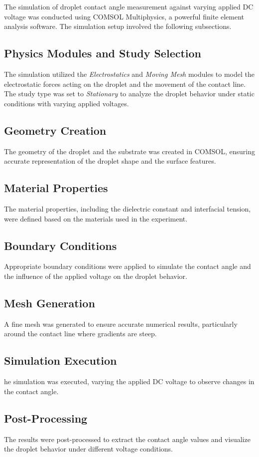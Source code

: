 \documentclass[9pt,a4paper,twocolumn,twoside]{tau-class/tau}
\begin{document}
The simulation of droplet contact angle measurement against varying applied DC voltage was conducted using COMSOL Multiphysics, a powerful finite element analysis software. The simulation setup involved the following subsections.

\subsection{Physics Modules and Study Selection}
The simulation utilized the \textit{Electrostatics} and \textit{Moving Mesh} modules to model the electrostatic forces acting on the droplet and the movement of the contact line. The study type was set to \textit{Stationary} to analyze the droplet behavior under static conditions with varying applied voltages.
\subsection{Geometry Creation}
The geometry of the droplet and the substrate was created in COMSOL, ensuring accurate representation of the droplet shape and the surface features.
\subsection{Material Properties}
The material properties, including the dielectric constant and interfacial tension, were defined based on the materials used in the experiment.
\subsection{Boundary Conditions}
Appropriate boundary conditions were applied to simulate the contact angle and the influence of the applied voltage on the droplet behavior.
\subsection{Mesh Generation}
A fine mesh was generated to ensure accurate numerical results, particularly around the contact line where gradients are steep.
\subsection{Simulation Execution}
he simulation was executed, varying the applied DC voltage to observe changes in the contact angle.
\subsection{Post-Processing}
The results were post-processed to extract the contact angle values and visualize the droplet behavior under different voltage conditions.
\end{document}
